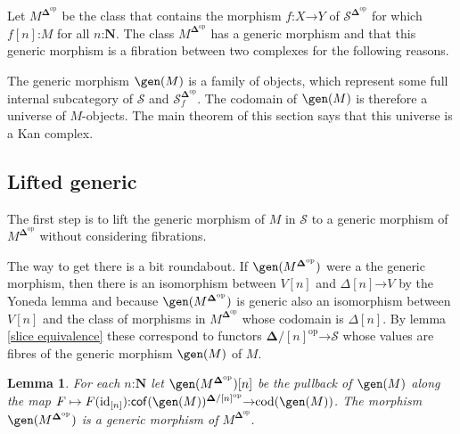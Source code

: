 \documentclass{amsart}
\theoremstyle{plain}
\newtheorem{lemma}[theorem]{Lemma}
\theoremstyle{definition}
\newcommand\cat\mathcal
\newcommand\id{\mathrm{id}}
\newcommand\cod{\mathrm{cod}}
\newcommand\nno{\mathbf N}
\newcommand\dual{^{\mathrm{op}}}
\newcommand\simCat{\mathbf\Delta}
\newcommand\s{^{\simCat\dual}}
\newcommand\of{\mathord:}
\renewcommand\to{\mathord\rightarrow}
\newcommand\simplex\Delta
\newcommand\f{_f}
\begin{document}
Let $M\s$ be the class that contains the morphism $f\of X\to Y$ of $\cat S\s$ for which $f[n]\of M$ for all $n\of\nno$. The class $M\s$ has a generic morphism and that this generic morphism is a fibration between two complexes for the following reasons.

The generic morphism $\gen(M)$ is a family of objects, which represent some full internal subcategory of $\cat S$ and $\cat S\s\f$. The codomain of $\gen(M)$ is therefore a universe of $M$-objects. The main theorem of this section says that this universe is a Kan complex.

\subsection{Lifted generic}
The first step is to lift the generic morphism of $M$ in $\cat S$ to a generic morphism of $M\s$ without considering fibrations. 

The way to get there is a bit roundabout. If $\gen(M\s)$ were a the generic morphism, then there is an isomorphism between $V[n]$ and $\simplex[n]\to V$ by the Yoneda lemma and because $\gen(M\s)$ is generic also an isomorphism between $V[n]$ and the class of morphisms in $M\s$ whose codomain is $\simplex[n]$. By lemma \ref{slice equivalence} these correspond to functors $\simCat/[n]\dual\to\cat S$ whose values are fibres of the generic morphism $\gen(M)$ of $M$. 

\begin{lemma}
For each $n\of\nno$ let $\gen(M\s)[n]$ be the pullback of $\gen(M)$ along the map $F\mapsto F(\id_{[n]})\of\cof(\gen(M))^{\simCat/[n]\dual}\to \cod(\gen(M))$. The morphism $\gen(M\s)$ is a generic morphism of $M\s$.
\end{lemma}
\end{document}
